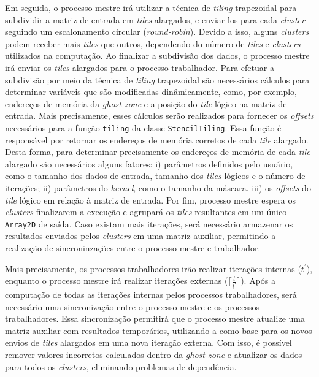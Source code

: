 Em seguida, o processo mestre irá utilizar a técnica de \textit{tiling}
trapezoidal para subdividir a matriz de entrada em \textit{tiles} alargados, e
enviar-los para cada \textit{cluster} seguindo um escalonamento circular
(\textit{round-robin}).  Devido a isso, alguns \textit{clusters} podem receber
mais \textit{tiles} que outros, dependendo do número de \textit{tiles} e
\textit{clusters} utilizados na computação. Ao finalizar a subdivisão dos dados,
o processo mestre irá enviar os \textit{tiles} alargados para o processo
trabalhador. Para efetuar a subdivisão por meio da técnica de \textit{tiling}
trapezoidal são necessários cálculos para determinar variáveis que são
modificadas dinâmicamente, como, por exemplo, endereços de memória da
\textit{ghost zone} e a posição do \textit{tile} lógico na matriz de entrada.
Mais precisamente, esses cálculos serão realizados para fornecer os
\textit{offsets} necessários para a função \texttt{tiling} da classe
\texttt{StencilTiling}. Essa função é responsável por retornar os endereços de
memória corretos de cada \textit{tile} alargado. Desta forma, para determinar
precisamente os endereços de memória de cada \textit{tile} alargado são
necessários alguns fatores: i) parâmetros definidos pelo usuário, como o tamanho
dos dados de entrada, tamanho dos \textit{tiles} lógicos e o número de
iterações; ii) parâmetros do \stencil \textit{kernel}, como o tamanho da
máscara. iii) os \textit{offsets} do \textit{tile} lógico em relação à matriz de
entrada. Por fim, processo mestre espera os \textit{clusters} finalizarem a
execução e agrupará os \textit{tiles} resultantes em um único \texttt{Array2D}
de saída. Caso existam mais iterações, será necessário armazenar os resultados
enviados pelos \textit{clusters} em uma matriz auxiliar, permitindo a realização
de sincroninzações entre o processo mestre e trabalhador.

Mais precisamente, os processos trabalhadores irão realizar iterações internas
($t^\prime$), enquanto o processo mestre irá realizar iterações externas
($\lceil\frac{t}{t^\prime}\rceil$). Após a computação de todas as iterações
internas pelos processos trabalhadores, será necessário uma sincronização entre
o processo mestre e os processos trabalhadores. Essa sincronização permitirá que
o processo mestre atualize uma matriz auxiliar com resultados temporários,
utilizando-a como base para os novos envios de \textit{tiles} alargados em uma
nova iteração externa. Com isso, é possível remover valores incorretos
calculados dentro da \textit{ghost zone} e atualizar os dados para todos os
\textit{clusters}, eliminando problemas de dependência.

